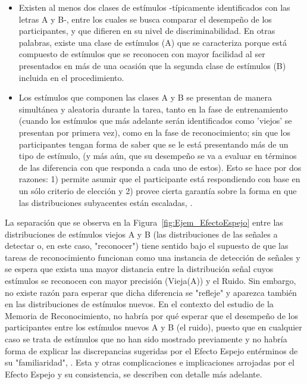 \begin{itemize}
\item Existen al menos dos clases de estímulos -típicamente identificados con las letras A y B-, entre los cuales se busca comparar el desempeño de los participantes, y que difieren en su nivel de discriminabilidad. En otras palabras, existe una clase de estímulos (A) que se caracteriza porque está compuesto de estímulos que se reconocen con mayor facilidad al ser presentados en más de una ocasión que la segunda clase de estímulos (B) incluida en el procedimiento.\\

\item Los estímulos que componen las clases A y B se presentan de manera simultánea y aleatoria durante la tarea, tanto en la fase de entrenamiento (cuando los estímulos que más adelante serán identificados como 'viejos' se presentan por primera vez), como en la fase de reconocimiento; sin que los participantes tengan forma de saber que se le está presentando más de un tipo de estímulo, (y más aún,  que su desempeño se va a evaluar en términos de las diferencia con que responda a cada uno de estos). Esto se hace por dos razones: 1) permite asumir que el participante está respondiendo con base en un sólo criterio de elección y 2) provee cierta garantía sobre la forma en que las distribuciones subyacentes están escaladas, \parencite{DeCarlo2007}.\\
\end{itemize}

La separación que se observa en la Figura~\ref{fig:Ejem_EfectoEspejo} entre las distribuciones de estímulos viejos A y B (las distribuciones de las señales a detectar o, en este caso, "reconocer") tiene sentido bajo el supuesto de que las tareas de reconocimiento funcionan como una instancia de detección de señales y se espera que exista una mayor distancia entre la distribución señal cuyos estímulos se reconocen con mayor precisión (Vieja(A)) y el Ruido. Sin embargo, no existe razón para esperar que dicha diferencia se "refleje" y aparezca también en las distribuciones de estímulos nuevos. En el contexto del estudio de la Memoria de Reconocimiento, no habría por qué esperar que el desempeño de los participantes entre los estímulos nuevos A y B (el ruido), puesto que en cualquier caso se trata de  estímulos que no han sido mostrado previamente y no habría forma de explicar las discrepancias sugeridas por el Efecto Espejo entérminos de su "familiaridad", \parencite{Glanzer1993}. Esta y otras complicaciones e implicaciones arrojadas por el Efecto Espejo y su consistencia, se describen con detalle más adelante.\\

